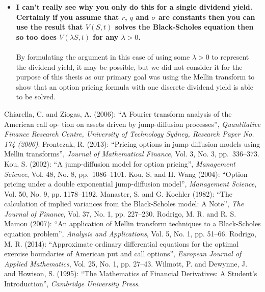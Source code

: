 \documentclass{article}
\begin{document}
\begin{enumerate}
\begin{itemize}
			\item{\textbf{I can't really see why you only do this for a single dividend yield. Certainly if you assume that $r$, $q$ and $\sigma$ are constants then you can use the result that $V(S,t)$ solves the Black-Scholes equation then so too does $V(\lambda S,t)$ for any $\lambda > 0$.
			\\\\}}
			By formulating the argument in this case of using some $\lambda > 0$ to represent the dividend yield, it may be possible, but we did not consider it for the purpose of this thesis as our primary goal was using the Mellin transform to show that an option pricing formula with one discrete dividend yield is able to be solved.
		\end{itemize}
\end{enumerate}

\begin{thebibliography}{100}
 Chiarella, C. and Ziogas, A. (2006): ``A Fourier transform analysis of the American call op- tion on assets driven by jump-diffusion processes'', \emph{Quantitative Finance Research Centre, University of Technology Sydney, Research Paper No. 174 (2006)}.
 Frontczak, R. (2013): ``Pricing options in jump-diffusion models using Mellin transforms'', \emph{Journal of Mathematical Finance}, Vol. 3, No. 3, pp.~336--373.
 Kou, S. (2002): ``A jump-diffusion model for option pricing'', \emph{Management Science}, Vol. 48, No. 8, pp.~1086--1101.
	 Kou, S. and H. Wang (2004): ``Option pricing under a double exponential jump-diffusion model'', \emph{Management Science}, Vol. 50, No. 9, pp. 1178--1192.
	 Manaster, S. and G. Koehler (1982): ``The calculation of implied variances from the Black-Scholes model: A Note'', \emph{The Journal of Finance}, Vol. 37, No. 1, pp. 227--230.
	 Rodrigo, M. R. and R. S. Mamon (2007): ``An application of Mellin transform techniques to a Black-Scholes equation problem'', \emph{Analysis and Applications}, Vol. 5, No. 1, pp. 51--66.
	 Rodrigo, M. R. (2014): ``Approximate ordinary differential equations for the optimal exercise boundaries of American put and call options'', \emph{European Journal of Applied Mathematics}, Vol. 25, No. 1, pp. 27--43.
	 Wilmott, P. and Dewynne, J. and Howison, S. (1995): ``The Mathematics of Financial Derivatives: A Student's Introduction'', \emph{Cambridge University Press}.

\end{thebibliography}
\end{document}
